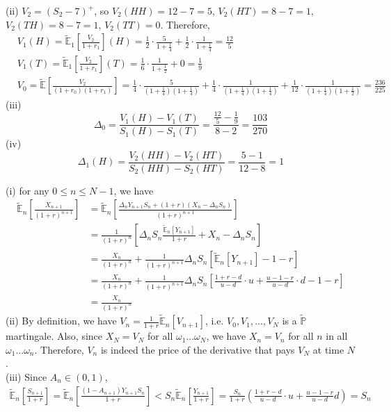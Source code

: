 \documentclass[12pt]{article}
\newenvironment{exercise}[2][Exercise]{\begin{trivlist}
		\item[\hskip \labelsep {\bfseries #1}\hskip \labelsep {\bfseries #2.}]}{\end{trivlist}}
\begin{document}
	(ii) $V_2 = (S_2-7)^+$, so $V_2(HH) = 12-7=5$, $V_2(HT) = 8-7 = 1$, $V_2(TH)=8-7 = 1$, $V_2(TT)=0$. Therefore,
	\begin{align*}
	&V_1(H) = \tilde{\mathbb{E}}_1\left[\frac{V_2}{1+r_1}\right](H) = \frac{1}{2}\cdot\frac{5}{1+\frac{1}{4}}+\frac{1}{2}\cdot\frac{1}{1+\frac{1}{4}}=\frac{12}{5}\\
	&V_1(T) = \tilde{\mathbb{E}}_1\left[\frac{V_2}{1+r_1}\right](T) = \frac{1}{6}\cdot\frac{1}{1+\frac{1}{2}}+0=\frac{1}{9}\\
	&V_0 =\tilde{\mathbb{E}}\left[\frac{V_2}{(1+r_0)(1+r_1)}\right]=\frac{1}{4}\cdot\frac{5}{(1+\frac{1}{4})(1+\frac{1}{4})}+\frac{1}{4}\cdot\frac{1}{(1+\frac{1}{4})(1+\frac{1}{4})}+\frac{1}{12}\cdot\frac{1}{(1+\frac{1}{4})(1+\frac{1}{2})}=\frac{236}{225}
	\end{align*}
	(iii) $$\Delta_0 = \frac{V_1(H)-V_1(T)}{S_1(H)-S_1(T)} = \frac{\frac{12}{5}-\frac{1}{9}}{8-2} = \frac{103}{270}$$
	(iv) $$\Delta_1(H) = \frac{V_2(HH)-V_2(HT)}{S_2(HH)-S_2(HT)} = \frac{5-1}{12-8} = 1$$
	\begin{exercise}{10}\end{exercise}
	(i) for any $0\le n\le N-1$, we have
	\begin{align*}
	\tilde{\mathbb{E}}_n\left[\frac{X_{n+1}}{(1+r)^{n+1}}\right] &= \tilde{\mathbb{E}}_n\left[\frac{\Delta_nY_{n+1}S_n + (1+r)(X_n-\Delta_n S_n)}{(1+r)^{n+1}}\right]\\
	&=\frac{1}{(1+r)^n}\left[\Delta_n S_n \frac{\tilde{\mathbb{E}}_n[Y_{n+1}]}{1+r}+X_n-\Delta_nS_n \right]\\
	&=\frac{X_n}{(1+r)^n}+\frac{1}{(1+r)^{n+1}}\Delta_nS_n\left[\tilde{\mathbb{E}}_n[Y_{n+1}]-1-r\right]\\
	&=\frac{X_n}{(1+r)^n}+\frac{1}{(1+r)^{n+1}}\Delta_nS_n\left[\frac{1+r-d}{u-d}\cdot u +\frac{u-1-r}{u-d}\cdot d -1-r\right]\\
	&=\frac{X_n}{(1+r)^n}
	\end{align*}
	(ii) By definition, we have $V_{n}=\frac{1}{1+r}\tilde{\mathbb{E}}_n[V_{n+1}]$, i.e. $V_0,V_1,...,V_N$ is a $\tilde{\mathbb{P}}$ martingale. Also, since $X_N = V_N$ for all $\omega_1...\omega_N$, we have $X_n = V_n$ for all $n$ in all $\omega_1...\omega_n$. Therefore, $V_n$ is indeed the price of the derivative that pays $V_N$ at time $N$. \\
	(iii) Since $A_n\in(0,1)$,\begin{align*}
	\tilde{\mathbb{E}}_n\left[\frac{S_{n+1}}{1+r}\right] = \tilde{\mathbb{E}}_n\left[\frac{(1-A_{n+1})Y_{n+1}S_n}{1+r}\right] < S_n\tilde{\mathbb{E}}_n\left[\frac{Y_{n+1}}{1+r}\right] = \frac{S_n}{1+r}\left(\frac{1+r-d}{u-d}\cdot u+\frac{u-1-r}{u-d}d\right)=S_n
	\end{align*}
\end{document}
